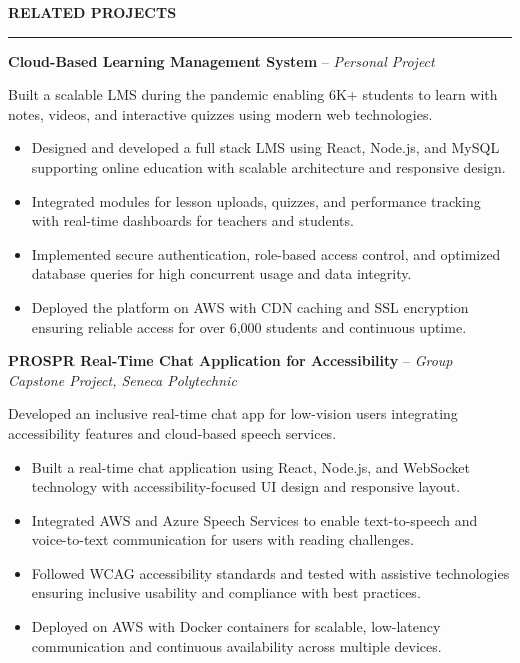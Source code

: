 \documentclass[10pt,letterpaper]{article}
\begin{document}
\vspace{6pt}

\textbf{RELATED PROJECTS}\\[-8pt]
\noindent\rule{\textwidth}{1pt}

\vspace{-2pt}

\textbf{Cloud-Based Learning Management System} -- \emph{Personal Project}

\vspace{-1pt}

Built a scalable LMS during the pandemic enabling 6K+ students to learn with notes, videos, and interactive quizzes using modern web technologies.
\vspace{-1pt}
\begin{itemize}
\item Designed and developed a full stack LMS using React, Node.js, and MySQL supporting online education with scalable architecture and responsive design.
\item Integrated modules for lesson uploads, quizzes, and performance tracking with real-time dashboards for teachers and students.
\item Implemented secure authentication, role-based access control, and optimized database queries for high concurrent usage and data integrity.
\item Deployed the platform on AWS with CDN caching and SSL encryption ensuring reliable access for over 6,000 students and continuous uptime.
\end{itemize}

\textbf{PROSPR  Real-Time Chat Application for Accessibility} -- \emph{Group Capstone Project, Seneca Polytechnic }

\vspace{-1pt}

Developed an inclusive real-time chat app for low-vision users integrating accessibility features and cloud-based speech services.
\vspace{-1pt}
\begin{itemize}
\item Built a real-time chat application using React, Node.js, and WebSocket technology with accessibility-focused UI design and responsive layout.
\item Integrated AWS and Azure Speech Services to enable text-to-speech and voice-to-text communication for users with reading challenges.
\item Followed WCAG accessibility standards and tested with assistive technologies ensuring inclusive usability and compliance with best practices.
\item Deployed on AWS with Docker containers for scalable, low-latency communication and continuous availability across multiple devices.
\end{itemize}
\end{document}
